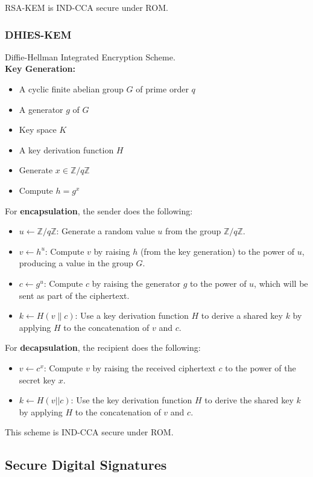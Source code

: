 RSA-KEM is IND-CCA secure under ROM.

\subsubsection{DHIES-KEM}
Diffie-Hellman Integrated Encryption Scheme. \\

\textbf{Key Generation:}
\begin{itemize}
    \item A cyclic finite abelian group $G$ of prime order $q$
    \item A generator $g$ of $G$
    \item Key space $K$
    \item A key derivation function $H$
    \item Generate $x \in \mathbb{Z}/q\mathbb{Z}$
    \item Compute $h = g^x$
\end{itemize}

For \textbf{encapsulation}, the sender does the following:
\begin{itemize}
    \item \( u \leftarrow \mathbb{Z}/q\mathbb{Z} \): Generate a random value \( u \) from the group \( \mathbb{Z}/q\mathbb{Z} \).
    \item \( v \leftarrow h^u \): Compute \( v \) by raising \( h \) (from the key generation) to the power of \( u \), producing a value in the group \( G \).
    \item \( c \leftarrow g^u \): Compute \( c \) by raising the generator \( g \) to the power of \( u \), which will be sent as part of the ciphertext.
    \item \( k \leftarrow H(v \parallel c) \): Use a key derivation function \( H \) to derive a shared key \( k \) by applying \( H \) to the concatenation of \( v \) and \( c \).
\end{itemize}

For \textbf{decapsulation}, the recipient does the following:
\begin{itemize}
    \item \( v \leftarrow c^x \): Compute \( v \) by raising the received ciphertext \( c \) to the power of the secret key \( x \).
    \item \( k \leftarrow H(v || c) \): Use the key derivation function \( H \) to derive the shared key \( k \) by applying \( H \) to the concatenation of \( v \) and \( c \).
\end{itemize}

This scheme is IND-CCA secure under ROM.

\subsection{Secure Digital Signatures} 